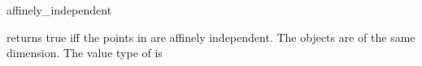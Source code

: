 \begin{ccRefFunction}{affinely_independent}
\ccHtmlNoLinks

{returns true iff the points in \ccc{A = tuple [first,last)} are
  affinely independent.  \ccPrecond The objects are of the same
  dimension.  \ccRequire The value type of  is
   }

\end{ccRefFunction}

